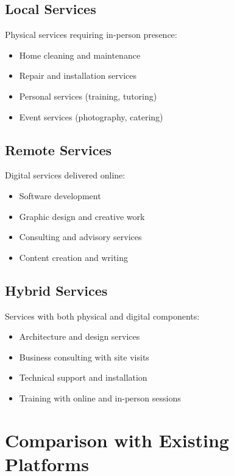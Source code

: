 \documentclass[11pt,a4paper]{article}
\begin{document}
\subsection{Local Services}

Physical services requiring in-person presence:
\begin{itemize}
    \item Home cleaning and maintenance
    \item Repair and installation services
    \item Personal services (training, tutoring)
    \item Event services (photography, catering)
\end{itemize}

\subsection{Remote Services}

Digital services delivered online:
\begin{itemize}
    \item Software development
    \item Graphic design and creative work
    \item Consulting and advisory services
    \item Content creation and writing
\end{itemize}

\subsection{Hybrid Services}

Services with both physical and digital components:
\begin{itemize}
    \item Architecture and design services
    \item Business consulting with site visits
    \item Technical support and installation
    \item Training with online and in-person sessions
\end{itemize}

\section{Comparison with Existing Platforms}
\end{document}
